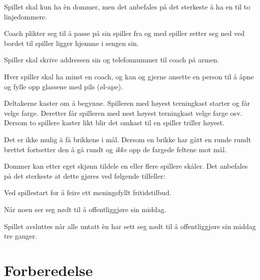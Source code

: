 \documentclass[10pt,a4paper,norsk,openany]{book}
\begin{document}
\begin{hus}
\item \label{sec:hus} Spillet skal kun ha èn dommer, men det anbefales på det
  sterkeste å ha en til to linjedommere.

\item Coach plikter seg til å passe på sin spiller fra og med spiller setter seg
  ned ved bordet til spiller ligger hjemme i sengen sin.

\item Spiller skal skrive addressen sin og telefonnummer til coach på armen.

\item \label{sec:hus-coach} Hver spiller skal ha minst en coach, og kan og
  gjerne ansette en person til å åpne og fylle opp glassene med pils (øl-ape).
    
\item \label{par:hus-start} Deltakerne kaster om å begynne. Spilleren med høyest
  terningkast starter og får velge farge. Deretter får spilleren med nest høyest
  terningkast velge farge osv. Dersom to spillere kaster likt blir det omkast
  til en spiller triller høyest.
    
\item \label{par:hus-hjem} Det er ikke mulig å få brikkene i mål. Dersom en
  brikke har gått en runde rundt brettet fortsetter den å gå rundt og
  \emph{ikke} opp de fargede feltene mot mål.
    
\item Dommer kan etter eget skjønn tildele en eller flere spillere skåler. Det
  anbefales på det sterkeste at dette gjøres ved følgende tilfeller:
    
    \begin{hus}
    \item Ved spillestart for å feire ett meningsfyllt fritidstilbud.
      
    \item Når noen ser seg nødt til å offentliggjøre sin middag.
    \end{hus}
      
  \item \label{par:hus-avsluttes} Spillet avsluttes når alle untatt èn har sett
    seg nødt til å offentliggjøre sin middag tre ganger.
\end{hus}


\chapter{Forberedelse}
\end{document}
